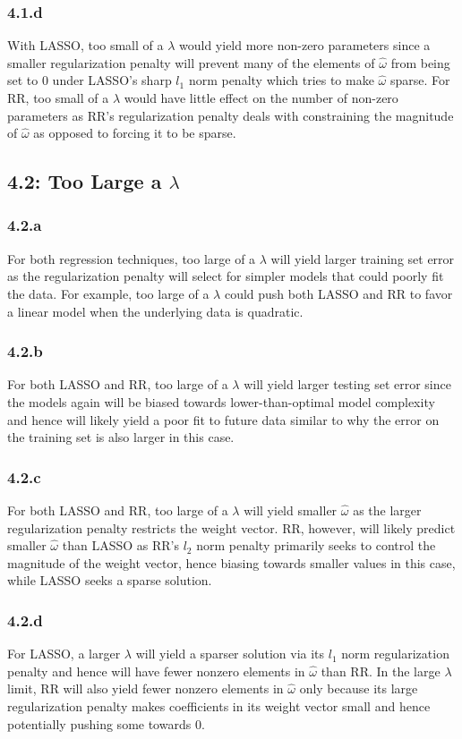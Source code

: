 \documentclass[12pt]{amsart}
\begin{document}
\subsubsection*{4.1.d}
With LASSO, too small of a $\lambda$ would yield more non-zero parameters since a smaller regularization penalty will prevent many of the elements of $\hat{\omega}$ from being set to 0 under LASSO's sharp $l_1$ norm penalty which tries to make $\hat{\omega}$ sparse.  For RR, too small of a $\lambda$ would have little effect on the number of non-zero parameters as RR's regularization penalty deals with constraining the magnitude of $\hat{\omega}$ as opposed to forcing it to be sparse.

\subsection*{4.2: Too Large a $\lambda$}
\subsubsection*{4.2.a}
For both regression techniques, too large of a $\lambda$ will yield larger training set error as the regularization penalty will select for simpler models that could poorly fit the data.  For example, too large of a $\lambda$ could push both LASSO and RR to favor a linear model when the underlying data is quadratic.

\subsubsection*{4.2.b}
For both LASSO and RR, too large of a $\lambda$ will yield larger testing set error since the models again will be biased towards lower-than-optimal model complexity and hence will likely yield a poor fit to future data similar to why the error on the training set is also larger in this case.

\subsubsection*{4.2.c}
For both LASSO and RR, too large of a $\lambda$ will yield smaller $\hat{\omega}$ as the larger regularization penalty restricts the weight vector.  RR, however, will likely predict smaller $\hat{\omega}$ than LASSO as RR's $l_2$ norm penalty primarily seeks to control the magnitude of the weight vector, hence biasing towards smaller values in this case, while LASSO seeks a sparse solution.

\subsubsection*{4.2.d}
For LASSO, a larger $\lambda$ will yield a sparser solution via its $l_1$ norm regularization penalty and hence will have fewer nonzero elements in $\hat{\omega}$ than RR.  In the large $\lambda$ limit, RR will also yield fewer nonzero elements in $\hat{\omega}$ only because its large regularization penalty makes coefficients in its weight vector small and hence potentially pushing some towards 0.
\end{document}
